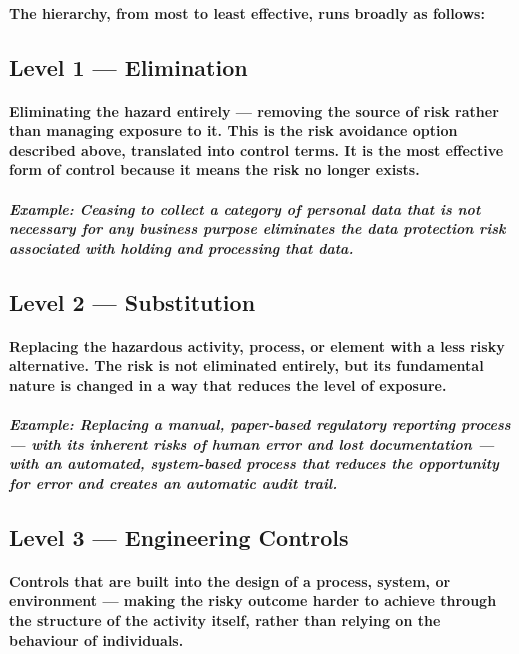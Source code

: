 \paragraph{The hierarchy, from most to least effective, runs broadly as follows:}

\subsection{Level 1 — Elimination}
\paragraph{Eliminating the hazard entirely — removing the source of risk rather than managing exposure to it. This is the risk avoidance option described above, translated into control terms. It is the most effective form of control because it means the risk no longer exists.}
\paragraph{\textit{Example: Ceasing to collect a category of personal data that is not necessary for any business purpose eliminates the data protection risk associated with holding and processing that data.}}

\subsection{Level 2 — Substitution}
\paragraph{Replacing the hazardous activity, process, or element with a less risky alternative. The risk is not eliminated entirely, but its fundamental nature is changed in a way that reduces the level of exposure.}
\paragraph{\textit{Example: Replacing a manual, paper-based regulatory reporting process — with its inherent risks of human error and lost documentation — with an automated, system-based process that reduces the opportunity for error and creates an automatic audit trail.}}

\subsection{Level 3 — Engineering Controls}
\paragraph{Controls that are built into the design of a process, system, or environment — making the risky outcome harder to achieve through the structure of the activity itself, rather than relying on the behaviour of individuals.}
